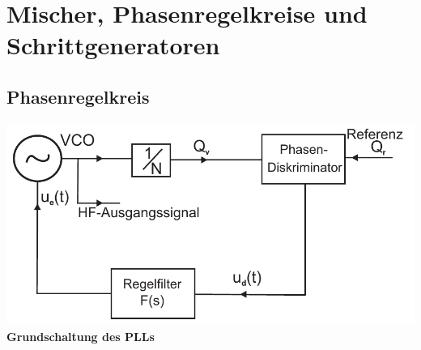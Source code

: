 \section{Mischer, Phasenregelkreise und Schrittgeneratoren}
\subsection{Phasenregelkreis}
\centering
\includegraphics[width=.3\paperheight]{content/hfmess/pictures/pll_grundschaltung.png}
\textbf{Grundschaltung des PLLs}
